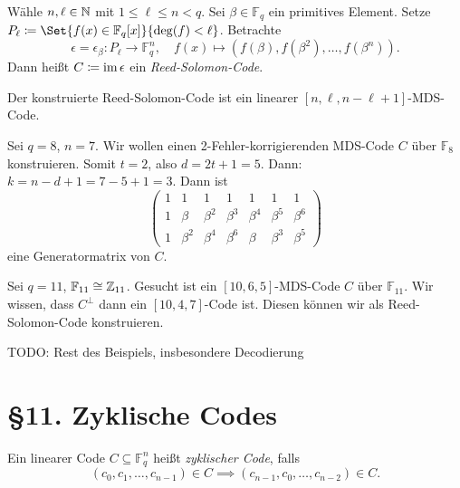 \documentclass{cheat-sheet}
\newcommand{\F}{\mathbb{F}} %
\begin{document}
\begin{defn}
  Wähle $n, \ell \in \mathbb{N}$ mit $1 \leq \ell \leq n < q$.
  Sei $\beta \in \F_q$ ein primitives Element.
  Setze $P_\ell \coloneqq \Set{f(x) \in \F_q[x]}{\deg(f) < \ell}$.
  Betrachte
  \[
    \epsilon = \epsilon_\beta : P_\ell \to \F_q^n, \quad
    f(x) \mapsto (f(\beta), f(\beta^2), \ldots, f(\beta^n)).
  \]
  Dann heißt $C \coloneqq \operatorname{im} \epsilon$ ein \emph{Reed-Solomon-Code}.
\end{defn}

\begin{satz}
  Der konstruierte Reed-Solomon-Code ist ein linearer $[n, \ell, n - \ell + 1]$-MDS-Code.
\end{satz}


\begin{bsp}
  Sei $q = 8$, $n = 7$.
  Wir wollen einen 2-Fehler-korrigierenden MDS-Code $C$ über $\F_8$ konstruieren.
  Somit $t = 2$, also $d = 2t + 1 = 5$.
  Dann: $k = n - d + 1 = 7 - 5 + 1 = 3$.
  Dann ist
  \[
    \begin{pmatrix}
      1 & 1 & 1 & 1 & 1 & 1 & 1 \\
      1 & \beta & \beta^2 & \beta^3 & \beta^4 & \beta^5 & \beta^6 \\
      1 & \beta^2 & \beta^4 & \beta^6 & \beta & \beta^3 & \beta^5
    \end{pmatrix}
  \]
  eine Generatormatrix von $C$.
\end{bsp}

\begin{bsp}
  Sei $q = 11$, $\F_{11} \cong \Z_{11}$.
  Gesucht ist ein $[10, 6, 5]$-MDS-Code $C$ über $\F_{11}$.
  Wir wissen, dass $C^\perp$ dann ein $[10, 4, 7]$-Code ist.
  Diesen können wir als Reed-Solomon-Code konstruieren.
\end{bsp}

TODO: Rest des Beispiels, insbesondere Decodierung


\section{§11. Zyklische Codes}


\begin{defn}
  Ein linearer Code $C \subseteq \F_q^n$ heißt \emph{zyklischer Code}, falls
  \[
    (c_0, c_1, \ldots, c_{n-1}) \in C \implies
    (c_{n-1}, c_0, \ldots, c_{n-2}) \in C.
  \]
\end{defn}
\end{document}
